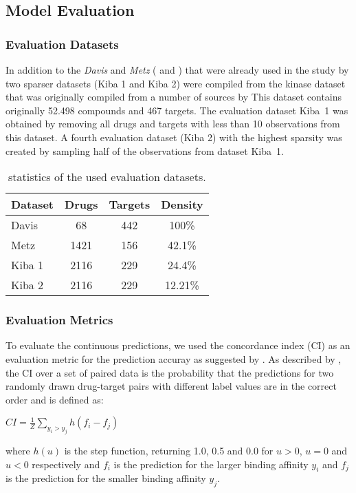 \documentclass[
journal=jacsat, %
manuscript=article]{achemso}
\begin{document}
\subsection{Model Evaluation}

\subsubsection{Evaluation Datasets}
In addition to the \textit{Davis} and \textit{Metz} (\citeauthor{davis2011comprehensive} and \citeauthor{metz2011navigating}) that were already used in the study by \citeauthor{pahikkala2014toward} two sparser datasets (Kiba 1 and Kiba 2) were compiled from the kinase dataset that was originally compiled from a number of sources by \citeauthor{doi:10.1021/ci400709d} This dataset contains originally 52.498 compounds and 467 targets. The evaluation dataset \mbox{Kiba 1} was obtained by removing all drugs and targets with less than 10 observations from this dataset. A fourth evaluation dataset (Kiba 2) with the highest sparsity was created by sampling half of the observations from dataset \mbox{Kiba 1}.
\begin{table}[]
\centering
\begin{tabular}{l c c c}
Dataset & Drugs & Targets & Density \\
\hline
Davis & 68 & 442 & 100\%\\
Metz & 1421 & 156 & 42.1\%\\
Kiba 1 & 2116 & 229 & 24.4\%\\
Kiba 2 & 2116& 229 & 12.21\%\\
\end{tabular}
\caption{statistics of the used evaluation datasets.}
\label{dataset_stats}
\end{table}

\subsubsection{Evaluation Metrics}
To evaluate the continuous predictions, we used the concordance index (CI) as an evaluation metric for the prediction accuray as suggested by \citeauthor{pahikkala2014toward}. As described by \citeauthor{pahikkala2014toward}, the CI over a set of paired data is the probability that the predictions for two randomly drawn drug-target pairs with different label values are in the correct order and is defined as:
\begin{center}
$CI = \frac{1}{Z}\sum\limits_{y_i> y_j}h(f_i-f_j)$
\end{center}
where $h(u)$ is the step function, returning 1.0, 0.5 and 0.0 for $u>0$, $u=0$ and $u<0$ respectively and $f_i$ is the prediction for the larger binding affinity $y_i$ and $f_j$ is the prediction for the smaller binding affinity $y_j$.
\end{document}

